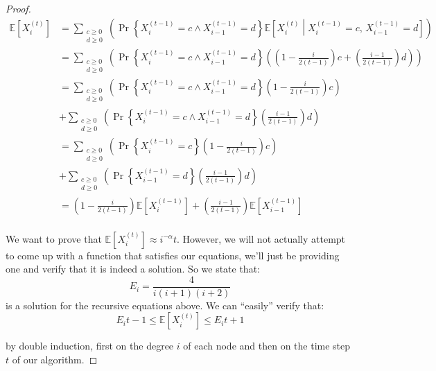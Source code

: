 \documentclass[]{article}
\begin{document}
\begin{proof}
\begingroup
\addtolength{\jot}{1em}
\begin{align*}
\mathbb{E}\left[X_i^{(t)} \right] &= \sum_{\substack{c \geq 0 \\ d \geq 0}}^{} \left( \Pr\left\{  X_i^{(t-1)} = c \wedge X_{i-1}^{(t-1)} = d \right\} \mathbb{E}\left[X_i^{(t)} \middle| X_i^{(t-1)} = c,\,  X_{i-1}^{(t-1)} = d\right] \right)\\
&= \sum_{\substack{c \geq 0 \\ d \geq 0}}^{} \left( \Pr\left\{  X_i^{(t-1)} = c \wedge X_{i-1}^{(t-1)} = d \right\} \left( \left(1- \frac{i}{2(t-1)}\right)c + \left( \frac{i-1}{2(t-1)}\right)d\right)\right)\\
&=  \sum_{\substack{c \geq 0 \\ d \geq 0}}^{} \left( \Pr\left\{  X_i^{(t-1)} = c \wedge X_{i-1}^{(t-1)} = d \right\} \left(1- \frac{i}{2(t-1)}\right)c\right)\\ &+  \sum_{\substack{c \geq 0 \\ d \geq 0}}^{} \left( \Pr\left\{  X_i^{(t-1)} = c \wedge X_{i-1}^{(t-1)} = d \right\}\left( \frac{i-1}{2(t-1)}\right)d \right)\\&=  \sum_{\substack{c \geq 0 \\ d \geq 0}}^{} \left( \Pr\left\{  X_i^{(t-1)} = c \right\} \left(1- \frac{i}{2(t-1)}\right)c\right)\\ &+  \sum_{\substack{c \geq 0 \\ d \geq 0}}^{} \left( \Pr\left\{ X_{i-1}^{(t-1)} = d \right\}\left( \frac{i-1}{2(t-1)}\right)d \right)\\
&= \left( 1 - \frac{i}{2(t-1)}\right)\mathbb{E}\left[X_i^{(t-1)} \right] + \left(\frac{i-1}{2(t-1)}\right)\mathbb{E}\left[X_{i-1}^{(t-1)} \right]\\
\end{align*}
\endgroup

We want to prove that $\mathbb{E}\left[X_i^{(t)} \right] \approx i^{-\alpha} t$. However, we will not actually attempt to come up with a function that satisfies our equations, we'll just be providing one and verify that it is indeed a solution. So we state that:
\[
	E_i = \frac{4}{i(i+1)(i+2)}
\]
is a solution for the recursive equations above. We can ``easily'' verify that:
\[
	E_i t - 1\leq \mathbb{E}\left[X_i^{(t)}\right] \leq E_i t + 1
\] 

by double induction, first on the degree $i$ of each node and then on the time step $t$ of our algorithm.


\end{proof}
\end{document}
